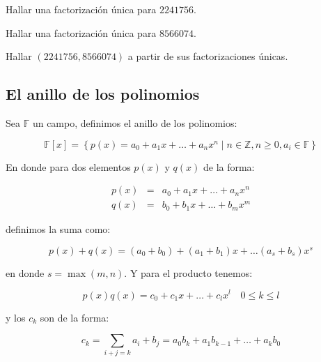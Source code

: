         \begin{ejemplo}
            Hallar una factorización única para $2241756$.

        \end{ejemplo}

        \begin{ejemplo}
            Hallar una factorización única para $8566074$.

        \end{ejemplo}

        \begin{ejemplo}
            Hallar $(2241756, 8566074)$ a partir de sus factorizaciones únicas.

        \end{ejemplo}

    \subsection{El anillo de los polinomios}

        \begin{definicion}
            Sea $\mathbb{F}$ un campo, definimos el anillo de los polinomios:

            \begin{equation}
                \mathbb{F}[x] = \left\{ p(x) = a_0 + a_1 x + \dots + a_n x^n \mid n \in \mathbb{Z}, n \geq 0, a_i \in \mathbb{F} \right\}
            \end{equation}

            En donde para dos elementos $p(x)$ y $q(x)$ de la forma:

            \begin{eqnarray*}
                p(x) & = & a_0 + a_1 x + \dots + a_n x^n \\
                q(x) & = & b_0 + b_1 x + \dots + b_m x^m 
            \end{eqnarray*}

            definimos la suma como:

            \begin{equation}
                p(x) + q(x) = (a_0 + b_0) + (a_1 + b_1) x + \dots (a_s + b_s) x^s
            \end{equation}

            en donde $s = \max{(m, n)}$. Y para el producto tenemos:

            \begin{equation}
                p(x)q(x) = c_0 + c_1 x + \dots + c_l x^l \quad 0 \leq k \leq l
            \end{equation}

            y los $c_k$ son de la forma:

            \begin{equation}
                c_k = \sum_{i+j = k} a_i + b_j = a_0 b_k + a_1 b_{k-1} + \dots + a_k b_0
            \end{equation}
        \end{definicion}


